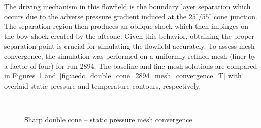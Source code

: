 The driving mechanism in this flowfield is the boundary layer separation which occurs due to the adverse pressure gradient induced at the $25^\circ/55^\circ$ cone junction.  The separation region then produces an oblique shock which then impinges on the bow shock created by the aftcone.  Given this behavior, obtaining the proper separation point is crucial for simulating the flowfield accurately. To assess mesh convergence, the simulation was performed on a uniformly refined mesh (finer by a factor of four) for run 2894. The baseline and fine mesh solutions are compared in Figures~\ref{fig:aedc_double_cone_2894_mesh_convergence_P} and~\ref{fig:aedc_double_cone_2894_mesh_convergence_T} with overlaid static pressure and temperature contours, respectively.
\begin{figure}[hbtp]
  \begin{center}
     \\      
    \caption{Sharp double cone -- static pressure mesh convergence\label{fig:aedc_double_cone_2894_mesh_convergence_P}}
  \end{center}
\end{figure}

